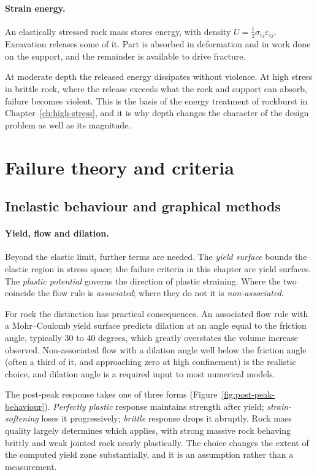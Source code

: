 \paragraph{Strain energy.}
An elastically stressed rock mass stores energy, with density
$U = \tfrac{1}{2}\sigma_{ij}\varepsilon_{ij}$. Excavation releases some of it.
Part is absorbed in deformation and in work done on the support, and the
remainder is available to drive fracture.

At moderate depth the released energy dissipates without violence. At high
stress in brittle rock, where the release exceeds what the rock and support
can absorb, failure becomes violent. This is the basis of the energy treatment
of rockburst in Chapter~\ref{ch:high-stress}, and it is why depth changes
the character of the design problem as well as its magnitude.

\section{Failure theory and criteria}
\label{sec:failure-theory-and-criteria}

\subsection{Inelastic behaviour and graphical methods}
\label{sec:inelastic-behaviour-and-graphical-methods}

\paragraph{Yield, flow and dilation.}
Beyond the elastic limit, further terms are needed. The \emph{yield
surface} bounds the elastic region in stress space; the failure criteria in
this chapter are yield surfaces. The \emph{plastic potential} governs the
direction of plastic straining. Where the two coincide the flow rule is
\emph{associated}; where they do not it is \emph{non-associated}.

For rock the distinction has practical consequences. An associated flow
rule with a Mohr--Coulomb yield surface predicts dilation at an angle equal to
the friction angle, typically 30 to 40 degrees, which greatly overstates the
volume increase observed. Non-associated flow with a dilation angle
well below the friction angle (often a third of it, and approaching zero at
high confinement) is the realistic choice, and dilation angle is a required
input to most numerical models.

The post-peak response takes one of three forms
(Figure~\ref{fig:post-peak-behaviour}). \emph{Perfectly plastic} response
maintains strength after yield; \emph{strain-softening} loses it
progressively; \emph{brittle} response drops it abruptly. Rock mass quality
largely determines which applies, with strong massive rock behaving brittly
and weak jointed rock nearly plastically. The choice changes the extent of the
computed yield zone substantially, and it is an assumption rather than a
measurement.

